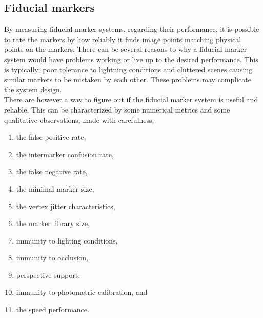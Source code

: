 			\subsection{Fiducial markers}\label{sec:fiducialMarkers}
				By measuring fiducial marker systems, regarding their performance, it is possible to rate the markers by how reliably it finds image points matching physical points on the markers. There can be several reasons to why a fiducial marker system would have problems working or live up to the desired performance. This is typically; poor tolerance to lightning conditions and cluttered scenes causing similar markers to be mistaken by each other\cite{fiducialMarkers}. These problems may complicate the system design.\\
				
				There are however a way to figure out if the fiducial marker system is useful and reliable. This can be characterized by some numerical metrics and some qualitative observations, made with carefulness;\\
				\begin{enumerate}
					\item the false positive rate,
					\item the intermarker confusion rate,
					\item the false negative rate,
					\item the minimal marker size,
					\item the vertex jitter characteristics,
					\item the marker library size,
					\item immunity to lighting conditions,
					\item immunity to occlusion,
					\item perspective support,
					\item immunity to photometric calibration, and
					\item the speed performance.\\
				\end{enumerate}
				
